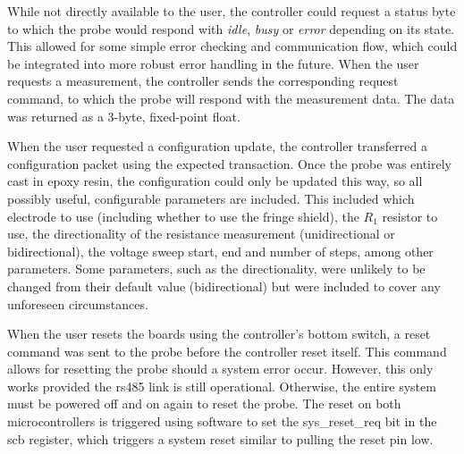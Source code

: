 While not directly available to the user, the controller could request a status byte to which the probe would respond with \textit{idle}, \textit{busy} or \textit{error} depending on its state.
This allowed for some simple error checking and communication flow, which could be integrated into more robust error handling in the future.
When the user requests a measurement, the controller sends the corresponding request command, to which the probe will respond with the measurement data.
The data was returned as a 3-byte, fixed-point float.

When the user requested a configuration update, the controller transferred a configuration packet using the expected transaction.
Once the probe was entirely cast in epoxy resin, the configuration could only be updated this way, so all possibly useful, configurable parameters are included.
This included which electrode to use (including whether to use the fringe shield), the $R_1$ resistor to use, the directionality of the resistance measurement (unidirectional or bidirectional), the voltage sweep start, end and number of steps, among other parameters.
Some parameters, such as the directionality, were unlikely to be changed from their default value (bidirectional) but were included to cover any unforeseen circumstances.

When the user resets the boards using the controller's bottom switch, a reset command was sent to the probe before the controller reset itself.
This command allows for resetting the probe should a system error occur.
However, this only works provided the \gls{rs485} link is still operational.
Otherwise, the entire system must be powered off and on again to reset the probe.
The reset on both microcontrollers is triggered using software to set the \gls{sys_reset_req} bit in the \gls{scb} register, which triggers a system reset similar to pulling the reset pin low.
